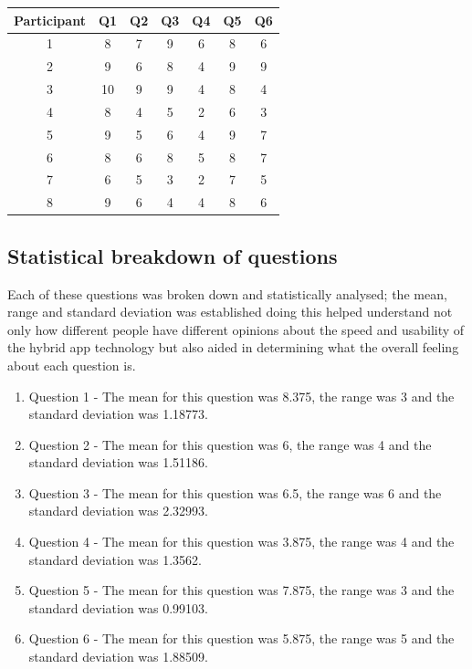 \begin{center} 
 \begin{tabular}{||c c c c c c c||}  
 \hline
  \hline
 Participant & Q1 & Q2 & Q3 & Q4 & Q5 & Q6 \\
 \hline
 1 & 8 & 7 & 9 & 6 & 8 & 6 \\
 \hline
 2 & 9 & 6 & 8 & 4 & 9 & 9 \\
 \hline
 3 & 10 & 9 & 9 & 4 & 8 & 4 \\
 \hline
 4 & 8 & 4 & 5 & 2 & 6 & 3 \\
 \hline
 5 & 9 & 5 & 6 & 4 & 9 & 7 \\
 \hline
 6 & 8 & 6 & 8 & 5 & 8 & 7 \\
 \hline
 7 & 6 & 5 & 3 & 2 & 7 & 5 \\ 
 \hline
 8 & 9 & 6 & 4 & 4 & 8 & 6 \\
 \end{tabular}
 \end{center}

 \subsection{Statistical breakdown of questions}
 Each of these questions was broken down and statistically analysed; the mean, range and standard deviation was established doing this helped understand not only how different people have different opinions about the speed and usability of the hybrid app technology but also aided in determining what the overall feeling about each question is.
 \begin{enumerate}
  \item Question 1 - The mean for this question was 8.375, the range was 3 and the standard deviation was 1.18773.
  \item Question 2 - The mean for this question was 6, the range was 4 and the standard deviation was 1.51186.
  \item Question 3 - The mean for this question was 6.5, the range was 6 and the standard deviation was 2.32993.
  \item Question 4 - The mean for this question was 3.875, the range was 4 and the standard deviation was 1.3562.
  \item Question 5 - The mean for this question was 7.875, the range was 3 and the standard deviation was 0.99103.
  \item Question 6 - The mean for this question was 5.875, the range was 5 and the standard deviation was 1.88509.
\end{enumerate}

